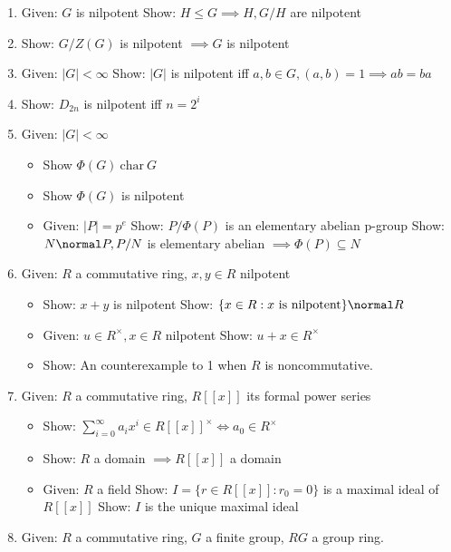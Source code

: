 \begin{enumerate}
\def\labelenumi{\arabic{enumi}.}
\item
  Given: $G$ is nilpotent Show: $H \leq G \implies H, G/H$ are nilpotent
\item
  Show: $G/Z(G)$ is nilpotent $\implies G$ is nilpotent
\item
  Given: $|G| < \infty$ Show: $|G|$ is nilpotent iff
  $a,b\in G, (a,b)=1 \implies ab=ba$
\item
  Show: $D_{2n}$ is nilpotent iff $n = 2^{i}$
\item
  Given: $|G| < \infty$

  \begin{itemize}
  \tightlist
  \item
    Show $\Phi(G)~\text{char}~ G$
  \item
    Show $\Phi(G)$ is nilpotent
  \item
    Given: $|P| = p^e$ Show: $P / \Phi(P)$ is an elementary abelian
    p-group Show:$N \normal P, P/N$ is elementary abelian
    $\implies \Phi(P) \subseteq N$
  \end{itemize}
\item
  Given: $R$ a commutative ring, $x,y \in R$ nilpotent

  \begin{itemize}
  \tightlist
  \item
    Show: $x+y$ is nilpotent Show:
    $\{x\in R : x \text{ is nilpotent}\} \normal R$
  \item
    Given: $u\in R^\times, x\in R$ nilpotent Show: $u+x\in R^\times$
  \item
    Show: An counterexample to 1 when $R$ is noncommutative.
  \end{itemize}
\item
  Given: $R$ a commutative ring, $R[[x]]$ its formal power series

  \begin{itemize}
  \tightlist
  \item
    Show:
    $\sum_{i=0}^\infty a_i x^i \in R[[x]]^\times \iff a_0 \in R^\times$
  \item
    Show: $R$ a domain $\implies R[[x]]$ a domain
  \item
    Given: $R$ a field Show: $I = \{ r \in R[[x]] : r_0 = 0\}$ is a
    maximal ideal of $R[[x]]$ Show: $I$ is the unique maximal ideal
  \end{itemize}
\item
  Given: $R$ a commutative ring, $G$ a finite group, $RG$ a group ring.


\end{enumerate}
